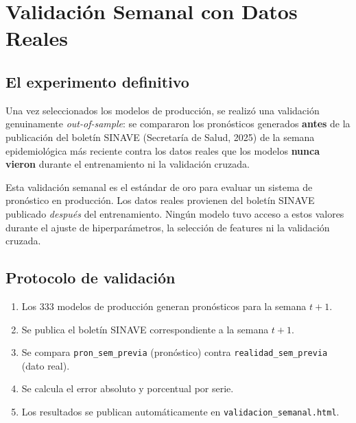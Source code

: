 \documentclass[12pt, letterpaper]{article}
\begin{document}
\newpage
\section{Validación Semanal con Datos Reales}\label{sec:validacion}

\subsection{El experimento definitivo}

Una vez seleccionados los modelos de producción, se realizó una validación genuinamente \textit{out-of-sample}: se compararon los pronósticos generados \textbf{antes} de la publicación del boletín SINAVE (Secretaría de Salud, 2025) de la semana epidemiológica más reciente contra los datos reales que los modelos \textbf{nunca vieron} durante el entrenamiento ni la validación cruzada.

\begin{insightbox}
Esta validación semanal es el estándar de oro para evaluar un sistema de pronóstico en producción. Los datos reales provienen del boletín SINAVE publicado \textit{después} del entrenamiento. Ningún modelo tuvo acceso a estos valores durante el ajuste de hiperparámetros, la selección de features ni la validación cruzada.
\end{insightbox}

\subsection{Protocolo de validación}

\begin{enumerate}[noitemsep]
    \item Los 333 modelos de producción generan pronósticos para la semana $t+1$.
    \item Se publica el boletín SINAVE correspondiente a la semana $t+1$.
    \item Se compara \texttt{pron\_sem\_previa} (pronóstico) contra \texttt{realidad\_sem\_previa} (dato real).
    \item Se calcula el error absoluto y porcentual por serie.
    \item Los resultados se publican automáticamente en \texttt{validacion\_semanal.html}.
\end{enumerate}
\end{document}
